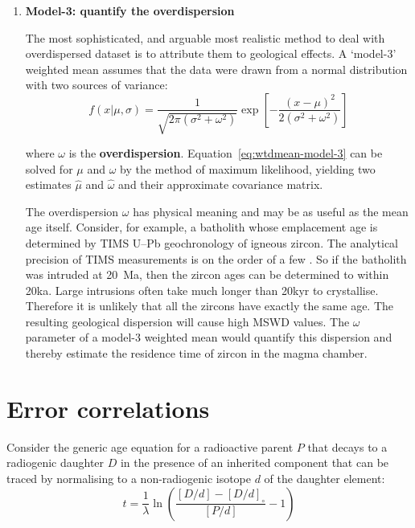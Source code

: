 \begin{refsection}
\begin{enumerate}
\item\textbf{Model-3: quantify the overdispersion}

  The most sophisticated, and arguable most realistic method to deal
  with overdispersed dataset is to attribute them to geological
  effects. A `model-3' weighted mean assumes that the data were drawn
  from a normal distribution with two sources of variance:
  \begin{equation}
    f(x|\mu,\sigma) = \frac{1}{\sqrt{2\pi\left(\sigma^2+\omega^2\right)}}
    \exp\!\left[-\frac{(x-\mu)^2}{2\left(\sigma^2 + \omega^2 \right)}\right]
    \label{eq:wtdmean-model-3}
  \end{equation}

\noindent where $\omega$ is the
\textbf{overdispersion}. Equation~\ref{eq:wtdmean-model-3} can be
solved for $\mu$ and $\omega$ by the method of maximum likelihood,
yielding two estimates $\hat{\mu}$ and $\hat{\omega}$ and their
approximate covariance matrix.

The overdispersion $\omega$ has physical meaning and may be as useful
as the mean age itself. Consider, for example, a batholith whose
emplacement age is determined by TIMS U--Pb geochronology of igneous
zircon. The analytical precision of TIMS measurements is on the order
of a few \textperthousand. So if the batholith was intruded at 20~Ma,
then the zircon ages can be determined to within 20ka. Large
intrusions often take much longer than 20kyr to crystallise. Therefore
it is unlikely that all the zircons have exactly the same age.  The
resulting geological dispersion will cause high MSWD values.  The
$\omega$ parameter of a model-3 weighted mean would quantify this
dispersion and thereby estimate the residence time of zircon in the
magma chamber.

\end{enumerate}

\section{Error correlations}
\label{sec:errorcorrelations}

Consider the generic age equation for a radioactive parent $P$
that decays to a radiogenic daughter $D$ in the presence of
an inherited component that can be traced by normalising to
a non-radiogenic isotope $d$ of the daughter element:
\begin{equation}
  t = \frac{1}{\lambda}
  \ln\left(\frac{\left[{D}/{d}\right]-\left[{D}/{d}\right]_\circ}
          {\left[{P}/{d}\right]} - 1\right)
\end{equation}


\end{refsection}
